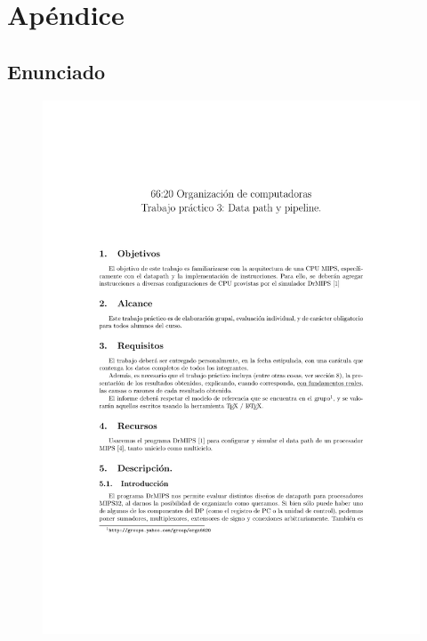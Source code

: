 \documentclass[a4paper, 12pt]{article}
\begin{document}
	
	\newpage
	\section{Apéndice}
	\subsection{Enunciado}

	\begin{figure}[H]
		\centering
		\includegraphics[scale=1, page = 1, clip, trim=1.2in 36mm 20mm 1.5in]{files/tp3-c2-2018.pdf}
	\end{figure}
	
\end{document}
